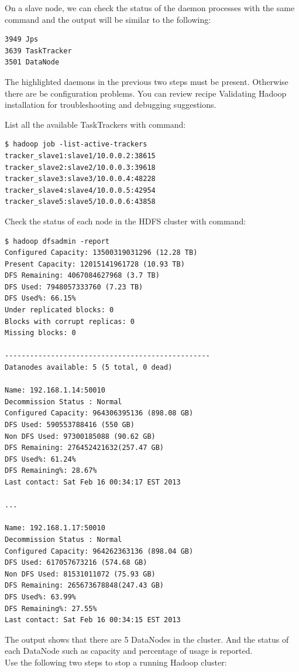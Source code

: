 On a slave node, we can check the status of the daemon processes with the same command and the output will be similar to the following:
\begin{verbatim}
3949 Jps
3639 TaskTracker
3501 DataNode
\end{verbatim}

The highlighted daemons in the previous two steps must be present. Otherwise there are be configuration problems. You can review recipe Validating Hadoop installation for troubleshooting and debugging suggestions.

List all the available TaskTrackers with command:
\lstset{style=bashstyle}
\begin{lstlisting}[caption=Listing all availble TaskTrackers.]
$ hadoop job -list-active-trackers
tracker_slave1:slave1/10.0.0.2:38615
tracker_slave2:slave2/10.0.0.3:39618
tracker_slave3:slave3/10.0.0.4:48228
tracker_slave4:slave4/10.0.0.5:42954
tracker_slave5:slave5/10.0.0.6:43858
\end{lstlisting}

Check the status of each node in the HDFS cluster with command:
\lstset{style=bashstyle}
\begin{lstlisting}[caption=The report of each node in the HDFS cluster]
$ hadoop dfsadmin -report
Configured Capacity: 13500319031296 (12.28 TB)
Present Capacity: 12015141961728 (10.93 TB)
DFS Remaining: 4067084627968 (3.7 TB)
DFS Used: 7948057333760 (7.23 TB)
DFS Used%: 66.15%
Under replicated blocks: 0
Blocks with corrupt replicas: 0
Missing blocks: 0

-------------------------------------------------
Datanodes available: 5 (5 total, 0 dead)

Name: 192.168.1.14:50010
Decommission Status : Normal
Configured Capacity: 964306395136 (898.08 GB)
DFS Used: 590553788416 (550 GB)
Non DFS Used: 97300185088 (90.62 GB)
DFS Remaining: 276452421632(257.47 GB)
DFS Used%: 61.24%
DFS Remaining%: 28.67%
Last contact: Sat Feb 16 00:34:17 EST 2013

...

Name: 192.168.1.17:50010
Decommission Status : Normal
Configured Capacity: 964262363136 (898.04 GB)
DFS Used: 617057673216 (574.68 GB)
Non DFS Used: 81531011072 (75.93 GB)
DFS Remaining: 265673678848(247.43 GB)
DFS Used%: 63.99%
DFS Remaining%: 27.55%
Last contact: Sat Feb 16 00:34:15 EST 2013
\end{lstlisting}

The output shows that there are 5 DataNodes in the cluster. And the status of each DataNode such as capacity and percentage of usage is reported. \\
Use the following two steps to stop a running Hadoop cluster:

